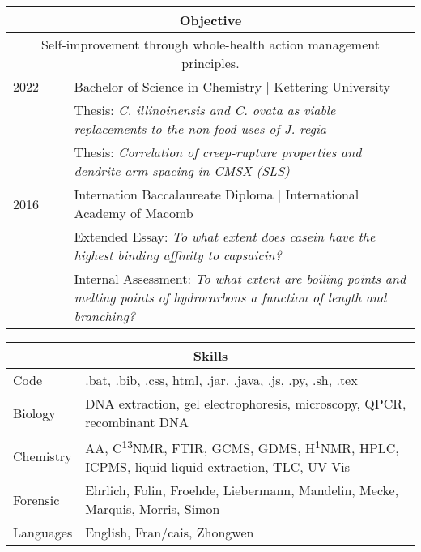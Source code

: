 \documentclass[10pt,draft,roman]{article}
\begin{document}
  \maketitle
  \begin{abstract}
  \end{abstract}
  \begin{tabular}{p{0.15\linewidth}|p{0.85\linewidth}}
    \hline
    \multicolumn{2}{|c|}{Objective} \\
    \hline
    \multicolumn{2}{|c|}{Self-improvement through whole-health action management principles.} \\
    \hline
    2022 & Bachelor of Science in Chemistry | Kettering University\\
      & Thesis: \textit{C. illinoinensis and C. ovata as viable replacements to the non-food uses of J. regia} \\
      & Thesis: \textit{Correlation of creep-rupture properties and dendrite arm spacing in CMSX\texttrademark-4 (SLS)}\\
    \hline
    2016 & Internation Baccalaureate Diploma | International Academy of Macomb \\
      & Extended Essay: \textit{To what extent does casein have the highest binding affinity to capsaicin?} \\
      & Internal Assessment: \textit{To what extent are boiling points and melting points of hydrocarbons a function of length and branching?} \\
    \hline
  \end{tabular}
  \begin{tabular}{p{0.15\linewidth}|p{0.85\linewidth}}
    \multicolumn{2}{|c|}{Skills} \\
    \hline
    Code & .bat, .bib, .css, html, .jar, .java, .js, .py, .sh, .tex \\
    Biology & DNA extraction, gel electrophoresis, microscopy, QPCR, recombinant DNA \\
    Chemistry &  AA, C\textsuperscript{13}NMR, FTIR, GCMS, GDMS, H\textsuperscript{1}NMR, HPLC, ICPMS, liquid-liquid extraction, TLC, UV-Vis \\
    Forensic &  Ehrlich, Folin, Froehde, Liebermann, Mandelin, Mecke, Marquis, Morris, Simon \\
    Languages & English, Fran/{c}ais, Zhongwen \\
  \hline
  \end{tabular}
\end{document}
